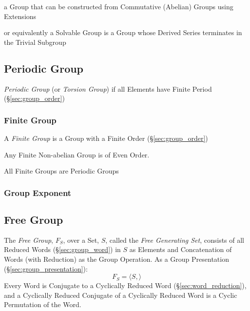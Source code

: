 a Group that can be constructed from Commutative (Abelian) Groups using
Extensions

or equivalently a Solvable Group is a Group whose Derived Series terminates in
the Trivial Subgroup



\subsection{Periodic Group}\label{sec:periodic_group}

\emph{Periodic Group} (or \emph{Torsion Group}) if all Elements have
Finite Period (\S\ref{sec:group_order})



\subsubsection{Finite Group}\label{sec:finite_group}

A \emph{Finite Group} is a Group with a Finite Order (\S\ref{sec:group_order})

Any Finite Non-abelian Group is of Even Order.

All Finite Groups are Periodic Groups



\subsubsection{Group Exponent}\label{sec:group_exponent}



\subsection{Free Group}\label{sec:free_group}

The \emph{Free Group}, $F_S$, over a Set, $S$, called the \emph{Free
  Generating Set}, consists of all Reduced Words
(\S\ref{sec:group_word}) in $S$ as Elements and Concatenation of Words
(with Reduction) as the Group Operation. As a Group Presentation
(\S\ref{sec:group_presentation}):
\[
    F_S = \langle S, \rangle
\]
Every Word is Conjugate to a Cyclically Reduced Word
(\S\ref{sec:word_reduction}), and a Cyclically Reduced Conjugate of a
Cyclically Reduced Word is a Cyclic Permutation of the Word.

